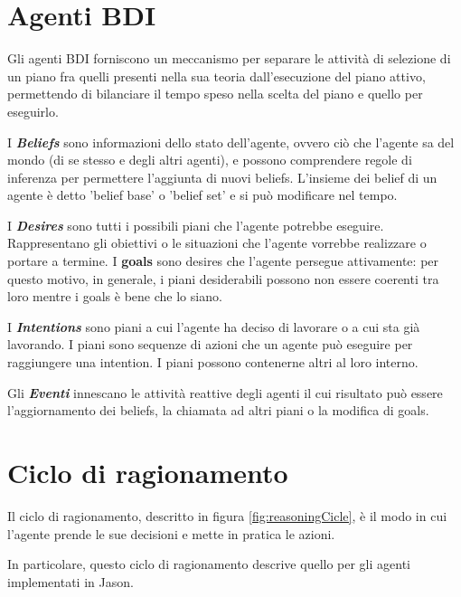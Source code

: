 \documentclass[12pt,a4paper,openright,twoside]{report}
\begin{document}
\section{Agenti BDI}
Gli agenti BDI forniscono un meccanismo per separare le attivit\`a di selezione di un piano fra quelli presenti nella sua teoria dall'esecuzione del piano attivo, permettendo di bilanciare il tempo speso nella scelta del piano e quello per eseguirlo.

I \textbf{\textit{Beliefs}} sono informazioni dello stato dell'agente, ovvero ci\`o che l'agente sa del mondo (di se stesso e degli altri agenti), e possono comprendere regole di inferenza per permettere l'aggiunta di nuovi beliefs. L'insieme dei belief di un agente \`e detto 'belief base' o 'belief set' e si pu\`o modificare nel tempo.

I \textbf{\textit{Desires}} sono tutti i possibili piani che l'agente potrebbe eseguire. Rappresentano gli obiettivi o le situazioni che l'agente vorrebbe realizzare o portare a termine. I \textbf{goals} sono desires che l'agente persegue attivamente: per questo motivo, in generale, i piani desiderabili possono non essere coerenti tra loro mentre i goals \`e bene che lo siano.

I \textbf{\textit{Intentions}} sono piani a cui l'agente ha deciso di lavorare o a cui sta gi\`a lavorando. I piani sono sequenze di azioni che un agente pu\`o eseguire per raggiungere una intention. I piani possono contenerne altri al loro interno.

Gli \textbf{\textit{Eventi}} innescano le attivit\`a reattive degli agenti il cui risultato pu\`o essere l'aggiornamento dei beliefs, la chiamata ad altri piani o la modifica di goals.


\section{Ciclo di ragionamento}
Il ciclo di ragionamento, descritto in figura \ref{fig:reasoningCicle}, \`e il modo in cui l'agente prende le sue decisioni e mette in pratica le azioni.

In particolare, questo ciclo di ragionamento descrive quello per gli agenti implementati in Jason.
\end{document}

